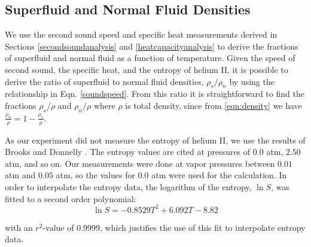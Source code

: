 \subsection{Superfluid and Normal Fluid Densities}\label{superfluiddensity}


We use the second sound speed and specific heat measurements derived
in Sections \ref{secondsoundanalysis} and \ref{heatcapacityanalysis}
to derive the fractions of superfluid and normal fluid as a function
of temperature. Given the speed of second sound, the specific heat,
and the entropy of helium II, it is possible to derive the ratio of
superfluid to normal fluid densities, $\rho_s/\rho_n$ by using the
relationship in Eqn. \ref{soundspeed}. From this ratio it is
straightforward to find the fractions $\rho_s/\rho$ and $\rho_n/\rho$
where $\rho$ is total density, since from \ref{eqn:density} we have
$\frac{\rho_n}{\rho} = 1 - \frac{\rho_s}{\rho}$.

As our experiment did not measure the entropy of helium II, we use the
results of Brooks and Donnelly \cite{brooks}. The entropy
values are cited at pressures of $0.0$ atm, $2.50$ atm, and so on. Our
measurements were done at vapor pressures between $0.01$ atm and
$0.05$ atm, so the values for $0.0$ atm were used for the calculation.
In order to interpolate the entropy data, the logarithm of the
entropy, $\ln S$, was fitted to a second order polynomial:
\begin{equation}
\ln S = -0.8529T^2 + 6.092T - 8.82
\end{equation}

with an $r^2$-value of $0.9999$, which justifies the use of this fit
to interpolate entropy data.

